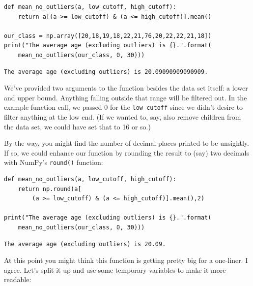 \begin{Verbatim}[fontsize=\footnotesize,samepage=true,frame=single,framesep=3mm]
def mean_no_outliers(a, low_cutoff, high_cutoff):
    return a[(a >= low_cutoff) & (a <= high_cutoff)].mean()

our_class = np.array([20,18,19,18,22,21,76,20,22,22,21,18])
print("The average age (excluding outliers) is {}.".format(
    mean_no_outliers(our_class, 0, 30)))
\end{Verbatim}

\vspace{-.2in}

\begin{Verbatim}[fontsize=\small,samepage=true,frame=leftline,framesep=5mm,framerule=1mm]
The average age (excluding outliers) is 20.09090909090909.
\end{Verbatim}

We've provided two arguments to the function besides the data set itself: a
lower and upper bound. Anything falling outside that range will be filtered
out. In the example function call, we passed 0 for the \texttt{low\_cutoff}
since we didn't desire to filter anything at the low end. (If we wanted to,
say, also remove children from the data set, we could have set that to 16 or
so.)

By the way, you might find the number of decimal places printed to be
unsightly. If so, we could enhance our function by rounding the result to (say)
two decimals with NumPy's \texttt{round()} function:

\label{round}

\begin{Verbatim}[fontsize=\footnotesize,samepage=true,frame=single,framesep=3mm]
def mean_no_outliers(a, low_cutoff, high_cutoff):
    return np.round(a[
        (a >= low_cutoff) & (a <= high_cutoff)].mean(),2)

print("The average age (excluding outliers) is {}.".format(
    mean_no_outliers(our_class, 0, 30)))
\end{Verbatim}
\vspace{-.2in}

\begin{Verbatim}[fontsize=\small,samepage=true,frame=leftline,framesep=5mm,framerule=1mm]
The average age (excluding outliers) is 20.09.
\end{Verbatim}

At this point you might think this function is getting pretty big for a
one-liner. I agree. Let's split it up and use some temporary variables to make
it more readable:

